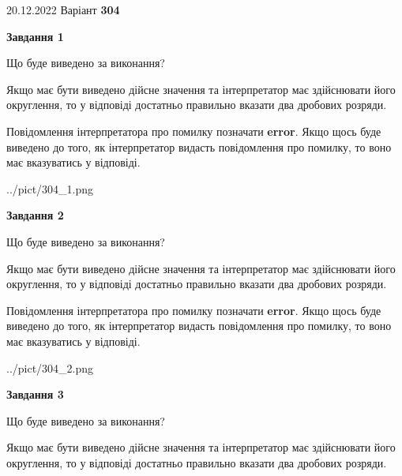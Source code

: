 \documentclass[12pt, ukrainian]{article}
\begin{document}
{20.12.2022 Варіант \No \textbf { 304 }\par}
{
\begin {Large}

{\begin {center}\textbf{Завдання 1}\end {center}}\par
Що буде виведено за виконання? \par

Якщо має бути виведено дійсне значення та інтерпретатор має здійснювати його округлення, 
то у відповіді достатньо правильно вказати два дробових розряди.

Повідомлення інтерпретатора про помилку позначати \textbf{error}.
Якщо щось буде виведено до того, як інтерпретатор видасть повідомлення про помилку, 
то воно має вказуватись у відповіді. \par

\begin{center}
	{../pict/304_1.png}
\end{center}
\newpage

{\begin {center}\textbf{Завдання 2}\end {center}}\par
Що буде виведено за виконання? \par

Якщо має бути виведено дійсне значення та інтерпретатор має здійснювати його округлення, 
то у відповіді достатньо правильно вказати два дробових розряди.

Повідомлення інтерпретатора про помилку позначати \textbf{error}.
Якщо щось буде виведено до того, як інтерпретатор видасть повідомлення про помилку, 
то воно має вказуватись у відповіді. \par

\begin{center}
	{../pict/304_2.png}
\end{center}
\newpage

{\begin {center}\textbf{Завдання 3}\end {center}}\par
Що буде виведено за виконання? \par

Якщо має бути виведено дійсне значення та інтерпретатор має здійснювати його округлення, 
то у відповіді достатньо правильно вказати два дробових розряди.


\end{Large}}
\end{document}
